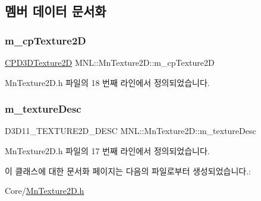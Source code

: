 \subsection{멤버 데이터 문서화}
\mbox{\label{class_m_n_l_1_1_mn_texture2_d_a8022c07cf05428dafeb35f9fd0035c37}} 
\subsubsection{\texorpdfstring{m\+\_\+cp\+Texture2D}{m\_cpTexture2D}}
{\footnotesize\ttfamily \hyperlink{namespace_m_n_l_addb538e1cbd1f443e6db5e6312487c51}{C\+P\+D3\+D\+Texture2D} M\+N\+L\+::\+Mn\+Texture2\+D\+::m\+\_\+cp\+Texture2D\hspace{0.3cm}{\ttfamily [private]}}



Mn\+Texture2\+D.\+h 파일의 18 번째 라인에서 정의되었습니다.

\mbox{\label{class_m_n_l_1_1_mn_texture2_d_a95de966ea71313ea1bbf7b199ca0488c}} 
\subsubsection{\texorpdfstring{m\+\_\+texture\+Desc}{m\_textureDesc}}
{\footnotesize\ttfamily D3\+D11\+\_\+\+T\+E\+X\+T\+U\+R\+E2\+D\+\_\+\+D\+E\+SC M\+N\+L\+::\+Mn\+Texture2\+D\+::m\+\_\+texture\+Desc\hspace{0.3cm}{\ttfamily [private]}}



Mn\+Texture2\+D.\+h 파일의 17 번째 라인에서 정의되었습니다.



이 클래스에 대한 문서화 페이지는 다음의 파일로부터 생성되었습니다.\+:\begin{DoxyCompactItemize}
\item 
Core/\hyperlink{_mn_texture2_d_8h}{Mn\+Texture2\+D.\+h}\end{DoxyCompactItemize}
